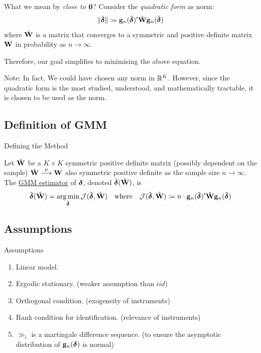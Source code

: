 \documentclass{beamer}
\begin{document}
\begin{frame}{}
	What we mean by \emph{close to $\ZERO$}?
	Consider the \emph{quadratic form} as norm:
	\begin{align*}
		\|\tilde{\ddelta}\|
		\coloneqq \gg_n(\tilde{\ddelta})'\hat{\WW}\gg_n(\tilde{\ddelta})
	\end{align*}
	where $\hat{\WW}$ is a matrix that converges to a symmetric and positive
	definite matrix $\WW$ in probability as $n\to\infty$.
	\begin{block}{}
		Therefore, our goal simplifies to minimising the above equation.
	\end{block}
	Note: In fact, We could have chosen any norm in $\reals[K]$.
	However, since the quadratic form is the most studied, understood, and mathematically tractable,
	it is chosen to be used as the norm.
\end{frame}

\subsection{Definition of GMM}

\begin{frame}{Defining the Method}
	\begin{definition}
		Let $\hat{\WW}$ be a $K\times K$ symmetric positive definite matrix
		(possibly dependent on the sample)
		\suchthat $\hat{\WW}\pto\WW$ also symmetric positive definite as the sample size $n\to\infty$.
		The \underline{GMM estimator} of $\ddelta$, denoted $\hat{\ddelta}(\hat{\WW})$, is
		\begin{align*}
			\hat{\ddelta}(\hat{\WW})
			= \argmin_{\tilde{\ddelta}} \mathcal{J}(\tilde{\ddelta},\hat{\WW})
			\quad\text{where}\quad
			\mathcal{J}(\tilde{\ddelta},\hat{\WW})
			\coloneqq n\cdot\gg_n(\tilde{\ddelta})'\hat{\WW}\gg_n(\tilde{\ddelta})
		\end{align*}
	\end{definition}
\end{frame}

\subsection{Assumptions}

\begin{frame}{Assumptions}
	\begin{enumerate}
		\item Linear model.
		\item Ergodic stationary. (weaker assumption than $iid$)
		\item Orthogonal condition. (exogeneity of instruments)
		\item Rank condition for identification. (relevance of instruments)
		\item $\gg_i$ is a martingale difference sequence. (to ensure the asymptotic distribution of $\gg_n(\ddelta)$ is normal)
	\end{enumerate}
\end{frame}
\end{document}
